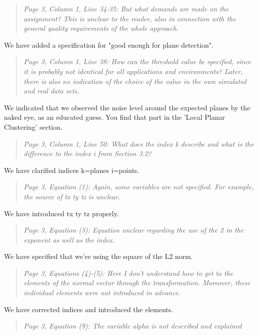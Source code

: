 \documentclass{article}
\newenvironment{itquote}
  {\begin{quote}\itshape}
  {\end{quote}\ignorespacesafterend}
\begin{document}
\begin{itquote}
Page 3, Column 1, Line 34-35: But what demands are made on the
assignment? This is unclear to the reader, also in connection with
the general quality requirements of the whole approach.
\end{itquote}

We have added a specification for "good enough for plane detection".

\begin{itquote}
Page 3, Column 1, Line 38: How can the threshold value be specified,
since it is probably not identical for all applications and
environments? Later, there is also no indication of the choice of
the value in the own simulated and real data sets.
\end{itquote}

We indicated that we observed the noise level around the expected planes by the naked eye, as an educated guess. You find that part in the 'Local Planar Clustering' section.

\begin{itquote}
Page 3, Column 1, Line 50: What does the index k describe and what
is the difference to the index i from Section 3.2?
\end{itquote}

We have clarified indices k=planes i=points.

\begin{itquote}
Page 3, Equation (1): Again, some variables are not specified. For
example, the source of tx ty tz is unclear.
\end{itquote}

We have introduced tx ty tz properly.

\begin{itquote}
Page 3, Equation (3): Equation unclear regarding the use of the 2 in
the exponent as well as the index.
\end{itquote}

We have specified that we're using the square of the L2 norm.

\begin{itquote}
Page 3, Equations (4)-(5): Here I don't understand how to get to the
elements of the normal vector through the transformation. Moreover,
these individual elements were not introduced in advance.
\end{itquote}

We have corrected indices and introduced the elements.

\begin{itquote}
Page 3, Equation (9): The variable alpha is not described and
explained
\end{itquote}
\end{document}
